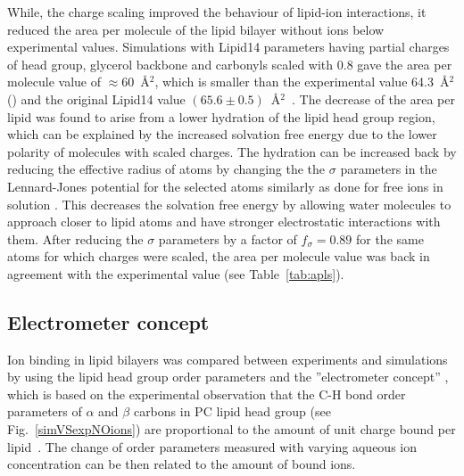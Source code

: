 \documentclass[aip,jcp,twocolumn]{revtex4}
\begin{document}
While, the charge scaling improved the behaviour of lipid-ion interactions,
it reduced the area per molecule of the lipid bilayer without ions below experimental
values. Simulations with Lipid14 parameters having partial charges of head group, glycerol
backbone and carbonyls scaled with 0.8 gave the area per molecule value of $\approx$60~\AA$^2$,
which is smaller than the experimental value 64.3~\AA$^2$ (\cite{})
and the original Lipid14 value $(65.6 \pm 0.5)$~\AA$^2$~\cite{dickson14}.
The decrease of the area per lipid was found to arise from a lower hydration of the lipid head group region,
which can be explained by the increased solvation free energy due to the lower polarity
of molecules with scaled charges. The hydration can be increased back
by reducing the effective radius of atoms by changing the 
the $\sigma$ parameters in the Lennard-Jones potential for the selected atoms
similarly as done for free ions in solution \cite{kohagen14,kohagen16,Pluharova2014}.
This decreases the solvation free energy by allowing water molecules to
approach closer to lipid atoms and have stronger electrostatic interactions with them.
After reducing the $\sigma$ parameters by a factor of $f_\sigma = 0.89$
for the same atoms for which charges were scaled, the area per molecule value was
back in agreement with the experimental value (see Table~\ref{tab:apls}). 


\subsection{Electrometer concept} \label{section:electrometer}
Ion binding in lipid bilayers was compared between experiments and simulations by 
using the lipid head group order parameters and the
''electrometer concept'' \cite{seelig87,catte16}, which
is based on the experimental observation that the C-H bond
order parameters of $\alpha$ and $\beta$ carbons in PC lipid head group
(see Fig.~\ref{simVSexpNOions}) are proportional to the amount 
of unit charge bound per lipid~\cite{seelig87}.
The change of order parameters measured with varying aqueous
ion concentration can be then related to the amount of bound ions.
\end{document}
